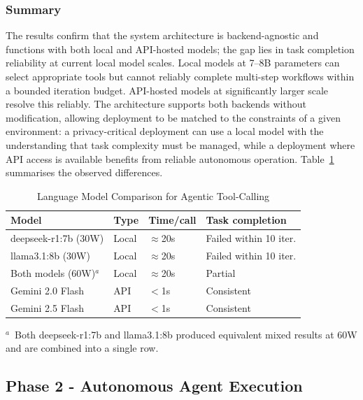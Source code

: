 \documentclass[conference]{IEEEtran}
\begin{document}
\subsubsection{Summary}

The results confirm that the system architecture is backend-agnostic and functions with both local and API-hosted models; the gap lies in task completion reliability at current local model scales. Local models at 7--8B parameters can select appropriate tools but cannot reliably complete multi-step workflows within a bounded iteration budget. API-hosted models at significantly larger scale resolve this reliably. The architecture supports both backends without modification, allowing deployment to be matched to the constraints of a given environment: a privacy-critical deployment can use a local model with the understanding that task complexity must be managed, while a deployment where API access is available benefits from reliable autonomous operation. Table~\ref{tab:model-comparison} summarises the observed differences.

\begin{table}[t]
  \caption{Language Model Comparison for Agentic Tool-Calling}
  \label{tab:model-comparison}
  \centering
  \begin{tabular}{llll}
    \toprule
    Model & Type & Time/call & Task completion \\
    \midrule
    deepseek-r1:7b (30W) & Local & $\approx$20s & Failed within 10 iter. \\
    llama3.1:8b (30W)    & Local & $\approx$20s & Failed within 10 iter. \\
    Both models (60W)$^{a}$ & Local & $\approx$20s & Partial \\
    Gemini 2.0 Flash     & API   & $<$1s        & Consistent \\
    Gemini 2.5 Flash     & API   & $<$1s        & Consistent \\
    \bottomrule
  \end{tabular}
  \par\smallskip
  \raggedright\footnotesize
  $^{a}$~Both deepseek-r1:7b and llama3.1:8b produced equivalent mixed results at 60W and are combined into a single row.
\end{table}

\subsection{Phase 2 - Autonomous Agent Execution}
\end{document}
